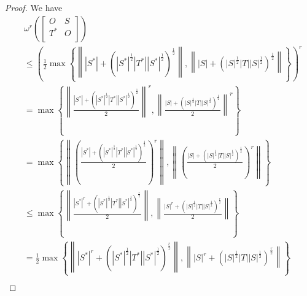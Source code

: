 \documentclass[12pt,twoside,reqno]{amsart}
\numberwithin{equation}{section}
\begin{document}
\begin{proof}
We have
\[\begin{aligned}
  & {{\omega }^{r}}\left( \left[ \begin{matrix}
   O & S  \\
   {{T}^{*}} & O  \\
\end{matrix} \right] \right) \\ 
 & \le {{\left( \frac{1}{2}\max \left\{ \left\| \left| {{S}^{*}} \right|+{{\left( {{\left| {{S}^{*}} \right|}^{\frac{1}{2}}}\left| {{T}^{*}} \right|{{\left| {{S}^{*}} \right|}^{\frac{1}{2}}} \right)}^{\frac{1}{2}}} \right\|,\left\| \left| S \right|+{{\left( {{\left| S \right|}^{\frac{1}{2}}}\left| T \right|{{\left| S \right|}^{\frac{1}{2}}} \right)}^{\frac{1}{2}}} \right\| \right\} \right)}^{r}} \\ 
 & =\max \left\{ {{\left\| \frac{\left| {{S}^{*}} \right|+{{\left( {{\left| {{S}^{*}} \right|}^{\frac{1}{2}}}\left| {{T}^{*}} \right|{{\left| {{S}^{*}} \right|}^{\frac{1}{2}}} \right)}^{\frac{1}{2}}}}{2} \right\|}^{r}},{{\left\| \frac{\left| S \right|+{{\left( {{\left| S \right|}^{\frac{1}{2}}}\left| T \right|{{\left| S \right|}^{\frac{1}{2}}} \right)}^{\frac{1}{2}}}}{2} \right\|}^{r}} \right\} \\ 
 & =\max \left\{ \left\| {{\left( \frac{\left| {{S}^{*}} \right|+{{\left( {{\left| {{S}^{*}} \right|}^{\frac{1}{2}}}\left| {{T}^{*}} \right|{{\left| {{S}^{*}} \right|}^{\frac{1}{2}}} \right)}^{\frac{1}{2}}}}{2} \right)}^{r}} \right\|,\left\| {{\left( \frac{\left| S \right|+{{\left( {{\left| S \right|}^{\frac{1}{2}}}\left| T \right|{{\left| S \right|}^{\frac{1}{2}}} \right)}^{\frac{1}{2}}}}{2} \right)}^{r}} \right\| \right\} \\ 
 & \le \max \left\{ \left\| \frac{{{\left| {{S}^{*}} \right|}^{r}}+{{\left( {{\left| {{S}^{*}} \right|}^{\frac{1}{2}}}\left| {{T}^{*}} \right|{{\left| {{S}^{*}} \right|}^{\frac{1}{2}}} \right)}^{\frac{r}{2}}}}{2} \right\|,\left\| \frac{{{\left| S \right|}^{r}}+{{\left( {{\left| S \right|}^{\frac{1}{2}}}\left| T \right|{{\left| S \right|}^{\frac{1}{2}}} \right)}^{\frac{r}{2}}}}{2} \right\| \right\} \\ 
 & =\frac{1}{2}\max \left\{ \left\| {{\left| {{S}^{*}} \right|}^{r}}+{{\left( {{\left| {{S}^{*}} \right|}^{\frac{1}{2}}}\left| {{T}^{*}} \right|{{\left| {{S}^{*}} \right|}^{\frac{1}{2}}} \right)}^{\frac{r}{2}}} \right\|,\left\| {{\left| S \right|}^{r}}+{{\left( {{\left| S \right|}^{\frac{1}{2}}}\left| T \right|{{\left| S \right|}^{\frac{1}{2}}} \right)}^{\frac{r}{2}}} \right\| \right\} \\ 

\end{aligned}\]
\end{proof}
\end{document}
